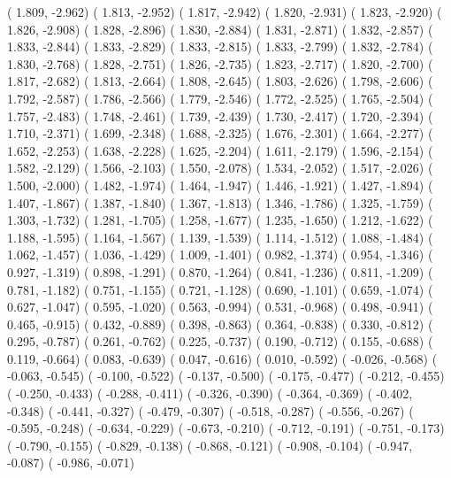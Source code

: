 {  (  1.809,  -2.962)  (  1.813,  -2.952)  (  1.817,  -2.942)  (  1.820,  -2.931)  (  1.823,  -2.920)
  (  1.826,  -2.908)  (  1.828,  -2.896)  (  1.830,  -2.884)  (  1.831,  -2.871)  (  1.832,  -2.857)
  (  1.833,  -2.844)  (  1.833,  -2.829)  (  1.833,  -2.815)  (  1.833,  -2.799)  (  1.832,  -2.784)
  (  1.830,  -2.768)  (  1.828,  -2.751)  (  1.826,  -2.735)  (  1.823,  -2.717)  (  1.820,  -2.700)
  (  1.817,  -2.682)  (  1.813,  -2.664)  (  1.808,  -2.645)  (  1.803,  -2.626)  (  1.798,  -2.606)
  (  1.792,  -2.587)  (  1.786,  -2.566)  (  1.779,  -2.546)  (  1.772,  -2.525)  (  1.765,  -2.504)
  (  1.757,  -2.483)  (  1.748,  -2.461)  (  1.739,  -2.439)  (  1.730,  -2.417)  (  1.720,  -2.394)
  (  1.710,  -2.371)  (  1.699,  -2.348)  (  1.688,  -2.325)  (  1.676,  -2.301)  (  1.664,  -2.277)
  (  1.652,  -2.253)  (  1.638,  -2.228)  (  1.625,  -2.204)  (  1.611,  -2.179)  (  1.596,  -2.154)
  (  1.582,  -2.129)  (  1.566,  -2.103)  (  1.550,  -2.078)  (  1.534,  -2.052)  (  1.517,  -2.026)
  (  1.500,  -2.000)  (  1.482,  -1.974)  (  1.464,  -1.947)  (  1.446,  -1.921)  (  1.427,  -1.894)
  (  1.407,  -1.867)  (  1.387,  -1.840)  (  1.367,  -1.813)  (  1.346,  -1.786)  (  1.325,  -1.759)
  (  1.303,  -1.732)  (  1.281,  -1.705)  (  1.258,  -1.677)  (  1.235,  -1.650)  (  1.212,  -1.622)
  (  1.188,  -1.595)  (  1.164,  -1.567)  (  1.139,  -1.539)  (  1.114,  -1.512)  (  1.088,  -1.484)
  (  1.062,  -1.457)  (  1.036,  -1.429)  (  1.009,  -1.401)  (  0.982,  -1.374)  (  0.954,  -1.346)
  (  0.927,  -1.319)  (  0.898,  -1.291)  (  0.870,  -1.264)  (  0.841,  -1.236)  (  0.811,  -1.209)
  (  0.781,  -1.182)  (  0.751,  -1.155)  (  0.721,  -1.128)  (  0.690,  -1.101)  (  0.659,  -1.074)
  (  0.627,  -1.047)  (  0.595,  -1.020)  (  0.563,  -0.994)  (  0.531,  -0.968)  (  0.498,  -0.941)
  (  0.465,  -0.915)  (  0.432,  -0.889)  (  0.398,  -0.863)  (  0.364,  -0.838)  (  0.330,  -0.812)
  (  0.295,  -0.787)  (  0.261,  -0.762)  (  0.225,  -0.737)  (  0.190,  -0.712)  (  0.155,  -0.688)
  (  0.119,  -0.664)  (  0.083,  -0.639)  (  0.047,  -0.616)  (  0.010,  -0.592)  ( -0.026,  -0.568)
  ( -0.063,  -0.545)  ( -0.100,  -0.522)  ( -0.137,  -0.500)  ( -0.175,  -0.477)  ( -0.212,  -0.455)
  ( -0.250,  -0.433)  ( -0.288,  -0.411)  ( -0.326,  -0.390)  ( -0.364,  -0.369)  ( -0.402,  -0.348)
  ( -0.441,  -0.327)  ( -0.479,  -0.307)  ( -0.518,  -0.287)  ( -0.556,  -0.267)  ( -0.595,  -0.248)
  ( -0.634,  -0.229)  ( -0.673,  -0.210)  ( -0.712,  -0.191)  ( -0.751,  -0.173)  ( -0.790,  -0.155)
  ( -0.829,  -0.138)  ( -0.868,  -0.121)  ( -0.908,  -0.104)  ( -0.947,  -0.087)  ( -0.986,  -0.071)
}
